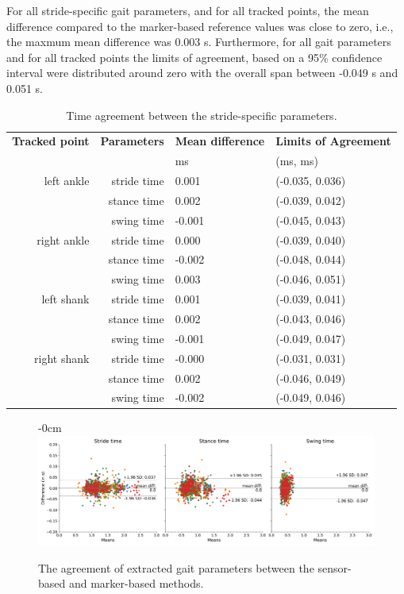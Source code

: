 \documentclass[sensors,article,submit,pdftex,moreauthors]{Definitions/mdpi}
\begin{document}
For all stride-specific gait parameters, and for all tracked points, the mean difference compared to the marker-based reference values was close to zero, i.e., the maxmum mean difference was 0.003 s. Furthermore, for all gait parameters and for all tracked points the limits of agreement, based on a 95\% confidence interval were distributed around zero with the overall span between -0.049 s and 0.051 s.
\begin{table}[H] 
	\caption{Time agreement between the stride-specific parameters. \label{tab:stride_parameters}}
	\begin{tabularx}{\textwidth}{rrCC}
		\toprule
		\textbf{Tracked point} & \textbf{Parameters} & \textbf{Mean difference} & \textbf{Limits of Agreement}\\
		 & & ms & (ms, ms)\\
		\midrule
		left ankle & stride time & 0.001 & (-0.035, 0.036)\\
		 & stance time & 0.002 & (-0.039, 0.042)\\
		 & swing time & -0.001 & (-0.045, 0.043)\\
		\midrule
		right ankle & stride time & 0.000 & (-0.039, 0.040)\\
		 & stance time & -0.002 & (-0.048, 0.044)\\
		 & swing time & 0.003 & (-0.046, 0.051)\\
		\midrule
		left shank & stride time & 0.001 & (-0.039, 0.041)\\
		& stance time & 0.002 & (-0.043, 0.046)\\
		& swing time & -0.001 & (-0.049, 0.047)\\
		\midrule
		right shank & stride time & -0.000 & (-0.031, 0.031)\\
		& stance time & 0.002 & (-0.046, 0.049)\\
		& swing time & -0.002 & (-0.049, 0.046)\\
		\bottomrule
	\end{tabularx}
	\noindent{}
\end{table}

\begin{figure}[H]
	\begin{adjustwidth}{-\extralength}{0cm}
		\centering
		\includegraphics[width=13.5cm]{fig/bland_altman_plots_stride_params.png}
	\end{adjustwidth}
	\caption{The agreement of extracted gait parameters between the sensor-based and marker-based methods.\label{fig:gait_parameters_bland_altman_plots}}
\end{figure}  
\end{document}
